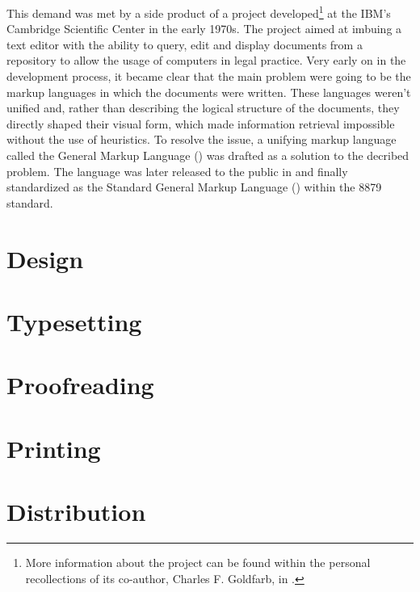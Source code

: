 \documentclass{book}
\begin{document}
        This demand was met by a side product of a project developed\footnote{
          More information about the project can be found within the personal
          recollections of its co-author, Charles F. Goldfarb, in
          \cite{goldfarb96,goldfarb97}.
        } at the IBM's Cambridge Scientific Center in the early 1970s. The
        project aimed at imbuing a text editor with the ability to query, edit
        and display documents from a repository to allow the usage of computers
        in legal practice. Very early on in the development process, it became
        clear that the main problem were going to be the markup languages in
        which the documents were written. These languages weren't unified and,
        rather than describing the logical structure of the documents, they
        directly shaped their visual form, which made information retrieval
        impossible without the use of heuristics. To resolve the issue, a
        unifying markup language called the General Markup Language
        () was drafted as a solution to the decribed problem. The
        language was later released to the public in \cite{goldfarb81} and
        finally standardized as the Standard General Markup Language
        () within the  8879 standard.


    \chapter{Design}
    \chapter{Typesetting}
    \chapter{Proofreading}
    \chapter{Printing}
    \chapter{Distribution}
\end{document}
